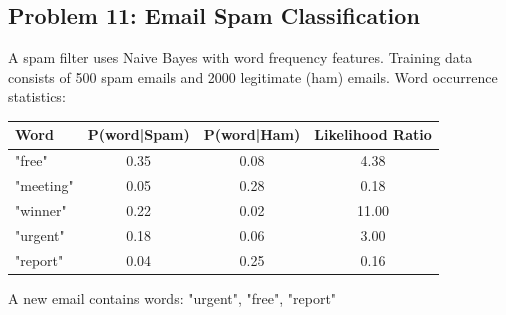 \documentclass[12pt]{article}
\begin{document}
\subsection*{Problem 11: Email Spam Classification}

A spam filter uses Naive Bayes with word frequency features. Training data consists of 500 spam emails and 2000 legitimate (ham) emails. Word occurrence statistics:

\begin{center}
\begin{tabular}{lccc}
\toprule
Word & P(word|Spam) & P(word|Ham) & Likelihood Ratio \\
\midrule
"free" & 0.35 & 0.08 & 4.38 \\
"meeting" & 0.05 & 0.28 & 0.18 \\
"winner" & 0.22 & 0.02 & 11.00 \\
"urgent" & 0.18 & 0.06 & 3.00 \\
"report" & 0.04 & 0.25 & 0.16 \\
\bottomrule
\end{tabular}
\end{center}

A new email contains words: "urgent", "free", "report"
\end{document}
